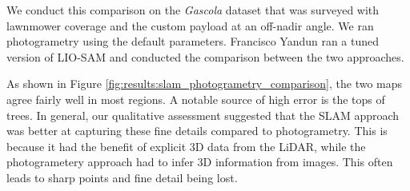 We conduct this comparison on the \textit{Gascola} dataset that was surveyed with lawnmower coverage and the custom payload at an off-nadir angle. We ran photogrametry using the default parameters. Francisco Yandun ran a tuned version of LIO-SAM and conducted the comparison between the two approaches.

As shown in Figure \ref{fig:results:slam_photogrametry_comparison}, the two maps agree fairly well in most regions. A notable source of high error is the tops of trees. In general, our qualitative assessment suggested that the SLAM approach was better at capturing these fine details compared to photogrametry. This is because it had the benefit of explicit 3D data from the LiDAR, while the photogrametery approach had to infer 3D information from images. This often leads to sharp points and fine detail being lost.


